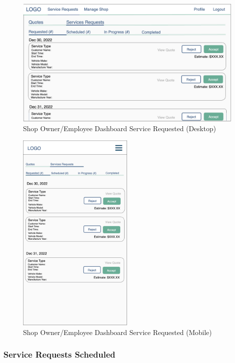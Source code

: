 \documentclass[12pt, titlepage]{article}
\begin{document}
\begin{figure}[H]
	\centering
	\includegraphics[width=\textwidth]{mockups/Shop Owner Dashboard (Service Requests - Requested) (Desktop).png}
	\caption{Shop Owner/Employee Dashboard \textemdash{} Service \textemdash{} Requested (Desktop)}
\end{figure}

\begin{figure}[H]
	\centering
	\includegraphics[width=0.5\textwidth]{mockups/Shop Owner Dashboard (Service Requests - Requested) (Mobile).png}
	\caption{Shop Owner/Employee Dashboard \textemdash{} Service \textemdash{} Requested (Mobile)}
\end{figure}

\subsubsection{Service Requests \textemdash{} Scheduled}
\end{document}
